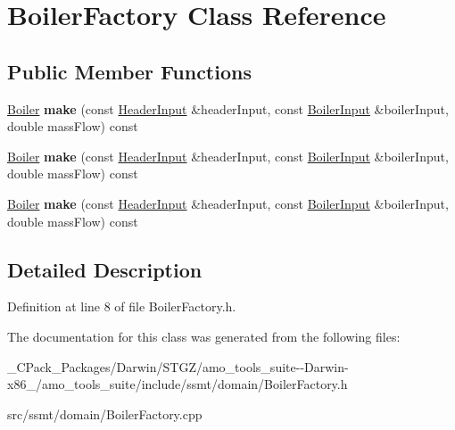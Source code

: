 \hypertarget{class_boiler_factory}{}\section{Boiler\+Factory Class Reference}
\label{class_boiler_factory}
\subsection*{Public Member Functions}
\begin{DoxyCompactItemize}
\item 
\mbox{\label{class_boiler_factory_ab65b6316b58d3ec26c39c9cf44a46107}} 
\hyperlink{class_boiler}{Boiler} {\bfseries make} (const \hyperlink{class_header_input}{Header\+Input} \&header\+Input, const \hyperlink{class_boiler_input}{Boiler\+Input} \&boiler\+Input, double mass\+Flow) const
\item 
\mbox{\label{class_boiler_factory_ab65b6316b58d3ec26c39c9cf44a46107}} 
\hyperlink{class_boiler}{Boiler} {\bfseries make} (const \hyperlink{class_header_input}{Header\+Input} \&header\+Input, const \hyperlink{class_boiler_input}{Boiler\+Input} \&boiler\+Input, double mass\+Flow) const
\item 
\mbox{\label{class_boiler_factory_ab65b6316b58d3ec26c39c9cf44a46107}} 
\hyperlink{class_boiler}{Boiler} {\bfseries make} (const \hyperlink{class_header_input}{Header\+Input} \&header\+Input, const \hyperlink{class_boiler_input}{Boiler\+Input} \&boiler\+Input, double mass\+Flow) const
\end{DoxyCompactItemize}


\subsection{Detailed Description}


Definition at line 8 of file Boiler\+Factory.\+h.



The documentation for this class was generated from the following files\+:\begin{DoxyCompactItemize}
\item 
\+\_\+\+C\+Pack\+\_\+\+Packages/\+Darwin/\+S\+T\+G\+Z/amo\+\_\+tools\+\_\+suite-\/-\/\+Darwin-\/x86\+\_/amo\+\_\+tools\+\_\+suite/include/ssmt/domain/Boiler\+Factory.\+h\item 
src/ssmt/domain/Boiler\+Factory.\+cpp\end{DoxyCompactItemize}
